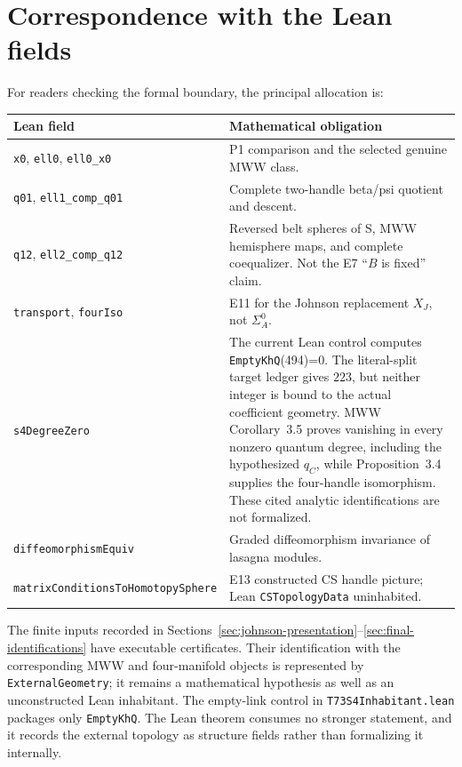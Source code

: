 \documentclass[11pt]{amsart}
\theoremstyle{definition}
\theoremstyle{remark}
\begin{document}


\section{Correspondence with the Lean fields}\label{app:lean-fields}

For readers checking the formal boundary, the principal allocation is:
\begin{center}
\small
\begin{tabularx}{\textwidth}{@{}l X@{}}
\toprule
Lean field & Mathematical obligation \\
\midrule
\texttt{x0}, \texttt{ell0}, \texttt{ell0\_x0} & P1 comparison and the selected genuine MWW class. \\
\texttt{q01}, \texttt{ell1\_comp\_q01} & Complete two-handle beta/psi quotient and descent. \\
\texttt{q12}, \texttt{ell2\_comp\_q12} & Reversed belt spheres of S, MWW hemisphere maps, and complete coequalizer.  Not the E7 ``$B$ is fixed'' claim. \\
\texttt{transport}, \texttt{fourIso} & E11 for the Johnson replacement $X_J$, not $\Sigma_A^0$. \\
\texttt{s4DegreeZero} & The current Lean control computes \texttt{EmptyKhQ}(494)=0.  The literal-split target ledger gives $223$, but neither integer is bound to the actual coefficient geometry.  MWW Corollary~3.5 proves vanishing in every nonzero quantum degree, including the hypothesized $q_C$, while Proposition~3.4 supplies the four-handle isomorphism.  These cited analytic identifications are not formalized. \\
\texttt{diffeomorphismEquiv} & Graded diffeomorphism invariance of lasagna modules. \\
\texttt{matrixConditionsToHomotopySphere} & E13 constructed CS handle picture; Lean \texttt{CSTopologyData} uninhabited. \\
\bottomrule
\end{tabularx}
\end{center}

The finite inputs recorded in Sections~\ref{sec:johnson-presentation}--\ref{sec:final-identifications}
have executable certificates.  Their identification with the corresponding
MWW and four-manifold objects is represented by
\texttt{ExternalGeometry}; it remains a mathematical hypothesis as well as an
unconstructed Lean inhabitant.
The empty-link control in \texttt{T73S4Inhabitant.lean} packages only
\texttt{EmptyKhQ}.  The Lean theorem consumes no stronger statement, and it
records the external topology as structure fields rather than formalizing it
internally.



\end{document}
